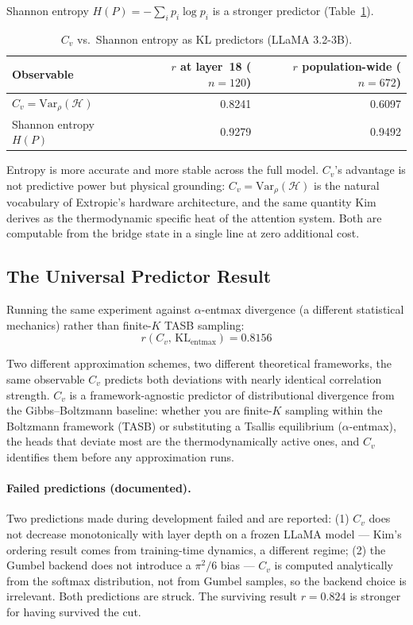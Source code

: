 \documentclass[11pt,a4paper]{article}
\begin{document}
Shannon entropy $H(P) = -\sum_i p_i \log p_i$ is a stronger predictor (Table~\ref{tab:predictors}).

\begin{table}[h]
\centering
\caption{$C_v$ vs.\ Shannon entropy as KL predictors (LLaMA 3.2-3B).}
\label{tab:predictors}
\begin{tabular}{@{}lrr@{}}
\toprule
Observable & $r$ at layer~18 ($n=120$) & $r$ population-wide ($n=672$) \\
\midrule
$C_v = \mathrm{Var}_\rho(\mathcal{H})$ & 0.8241 & 0.6097 \\
Shannon entropy $H(P)$ & 0.9279 & 0.9492 \\
\bottomrule
\end{tabular}
\end{table}

Entropy is more accurate and more stable across the full model. $C_v$'s advantage
is not predictive power but physical grounding: $C_v = \mathrm{Var}_\rho(\mathcal{H})$
is the natural vocabulary of Extropic's hardware architecture, and the same quantity
Kim derives as the thermodynamic specific heat of the attention system. Both are
computable from the bridge state in a single line at zero additional cost.

\subsection{The Universal Predictor Result}

Running the same experiment against $\alpha$-entmax divergence (a different statistical
mechanics) rather than finite-$K$ TASB sampling:
\begin{equation}
  r(C_v,\, \mathrm{KL}_\mathrm{entmax}) = 0.8156
\end{equation}

Two different approximation schemes, two different theoretical frameworks, the same
observable $C_v$ predicts both deviations with nearly identical correlation strength.
$C_v$ is a framework-agnostic predictor of distributional divergence from the
Gibbs--Boltzmann baseline: whether you are finite-$K$ sampling within the Boltzmann
framework (TASB) or substituting a Tsallis equilibrium ($\alpha$-entmax), the heads
that deviate most are the thermodynamically active ones, and $C_v$ identifies them
before any approximation runs.

\paragraph{Failed predictions (documented).}
Two predictions made during development failed and are reported:
(1) $C_v$ does not decrease monotonically with layer depth on a frozen LLaMA model
--- Kim's ordering result comes from training-time dynamics, a different regime;
(2) the Gumbel backend does not introduce a $\pi^2/6$ bias --- $C_v$ is computed
analytically from the softmax distribution, not from Gumbel samples, so the backend
choice is irrelevant. Both predictions are struck. The surviving result $r=0.824$
is stronger for having survived the cut.
\end{document}
